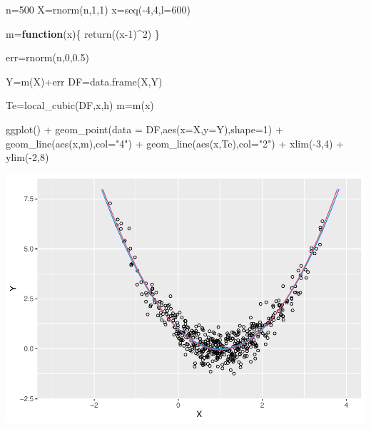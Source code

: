 \documentclass[
]{article}
\newenvironment{Shaded}{\begin{snugshade}}{\end{snugshade}}
\newcommand{\AttributeTok}[1]{\textcolor[rgb]{0.77,0.63,0.00}{#1}}
\newcommand{\ControlFlowTok}[1]{\textcolor[rgb]{0.13,0.29,0.53}{\textbf{#1}}}
\newcommand{\DecValTok}[1]{\textcolor[rgb]{0.00,0.00,0.81}{#1}}
\newcommand{\FloatTok}[1]{\textcolor[rgb]{0.00,0.00,0.81}{#1}}
\newcommand{\FunctionTok}[1]{\textcolor[rgb]{0.00,0.00,0.00}{#1}}
\newcommand{\NormalTok}[1]{#1}
\newcommand{\OtherTok}[1]{\textcolor[rgb]{0.56,0.35,0.01}{#1}}
\newcommand{\SpecialCharTok}[1]{\textcolor[rgb]{0.00,0.00,0.00}{#1}}
\newcommand{\StringTok}[1]{\textcolor[rgb]{0.31,0.60,0.02}{#1}}
\begin{document}
\begin{Shaded}
\begin{Highlighting}[]
\NormalTok{n}\OtherTok{=}\DecValTok{500}
\NormalTok{X}\OtherTok{=}\FunctionTok{rnorm}\NormalTok{(n,}\DecValTok{1}\NormalTok{,}\DecValTok{1}\NormalTok{)}
\NormalTok{x}\OtherTok{=}\FunctionTok{seq}\NormalTok{(}\SpecialCharTok{{-}}\DecValTok{4}\NormalTok{,}\DecValTok{4}\NormalTok{,}\AttributeTok{l=}\DecValTok{600}\NormalTok{)}

\NormalTok{m}\OtherTok{=}\ControlFlowTok{function}\NormalTok{(x)\{}
  \FunctionTok{return}\NormalTok{((x}\DecValTok{{-}1}\NormalTok{)}\SpecialCharTok{\^{}}\DecValTok{2}\NormalTok{)}
\NormalTok{\}}

\NormalTok{err}\OtherTok{=}\FunctionTok{rnorm}\NormalTok{(n,}\DecValTok{0}\NormalTok{,}\FloatTok{0.5}\NormalTok{)}

\NormalTok{Y}\OtherTok{=}\FunctionTok{m}\NormalTok{(X)}\SpecialCharTok{+}\NormalTok{err}
\NormalTok{DF}\OtherTok{=}\FunctionTok{data.frame}\NormalTok{(X,Y)}


\NormalTok{Te}\OtherTok{=}\FunctionTok{local\_cubic}\NormalTok{(DF,x,h)}
\NormalTok{m}\OtherTok{=}\FunctionTok{m}\NormalTok{(x)}

\FunctionTok{ggplot}\NormalTok{() }\SpecialCharTok{+} \FunctionTok{geom\_point}\NormalTok{(}\AttributeTok{data =}\NormalTok{ DF,}\FunctionTok{aes}\NormalTok{(}\AttributeTok{x=}\NormalTok{X,}\AttributeTok{y=}\NormalTok{Y),}\AttributeTok{shape=}\DecValTok{1}\NormalTok{) }\SpecialCharTok{+} \FunctionTok{geom\_line}\NormalTok{(}\FunctionTok{aes}\NormalTok{(x,m),}\AttributeTok{col=}\StringTok{"4"}\NormalTok{) }\SpecialCharTok{+} 
  \FunctionTok{geom\_line}\NormalTok{(}\FunctionTok{aes}\NormalTok{(x,Te),}\AttributeTok{col=}\StringTok{"2"}\NormalTok{) }\SpecialCharTok{+} \FunctionTok{xlim}\NormalTok{(}\SpecialCharTok{{-}}\DecValTok{3}\NormalTok{,}\DecValTok{4}\NormalTok{) }\SpecialCharTok{+} \FunctionTok{ylim}\NormalTok{(}\SpecialCharTok{{-}}\DecValTok{2}\NormalTok{,}\DecValTok{8}\NormalTok{)}
\end{Highlighting}
\end{Shaded}

\includegraphics{Problemsetrmd_files/figure-latex/unnamed-chunk-10-1.pdf}
\end{document}
